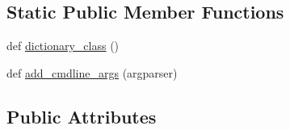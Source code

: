 \subsection*{Static Public Member Functions}
\begin{DoxyCompactItemize}
\item 
def \hyperlink{classprojects_1_1personachat_1_1kvmemnn_1_1kvmemnn_1_1KvmemnnAgent_a5b97a313aca270ad38c6ff48b1e9695a}{dictionary\+\_\+class} ()
\item 
def \hyperlink{classprojects_1_1personachat_1_1kvmemnn_1_1kvmemnn_1_1KvmemnnAgent_a2428cf6a8e0a0e5adcdc7ba261e305b5}{add\+\_\+cmdline\+\_\+args} (argparser)
\end{DoxyCompactItemize}
\subsection*{Public Attributes}
